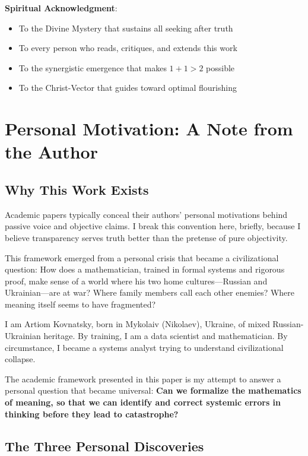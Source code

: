 \documentclass[11pt,a4paper]{article}
\theoremstyle{definition}
\theoremstyle{remark}
\begin{document}
\textbf{Spiritual Acknowledgment}:
\begin{itemize}
\item To the Divine Mystery that sustains all seeking after truth
\item To every person who reads, critiques, and extends this work
\item To the synergistic emergence that makes \(1+1 > 2\) possible
\item To the Christ-Vector that guides toward optimal flourishing
\end{itemize}

\appendix
\section{Personal Motivation: A Note from the Author}

\subsection{Why This Work Exists}

Academic papers typically conceal their authors' personal motivations behind passive voice and objective claims. I break this convention here, briefly, because I believe transparency serves truth better than the pretense of pure objectivity.

This framework emerged from a personal crisis that became a civilizational question: How does a mathematician, trained in formal systems and rigorous proof, make sense of a world where his two home cultures—Russian and Ukrainian—are at war? Where family members call each other enemies? Where meaning itself seems to have fragmented?

I am Artiom Kovnatsky, born in Mykolaiv (Nikolaev), Ukraine, of mixed Russian-Ukrainian heritage. By training, I am a data scientist and mathematician. By circumstance, I became a systems analyst trying to understand civilizational collapse.

The academic framework presented in this paper is my attempt to answer a personal question that became universal: \textbf{Can we formalize the mathematics of meaning, so that we can identify and correct systemic errors in thinking before they lead to catastrophe?}

\subsection{The Three Personal Discoveries}
\end{document}
